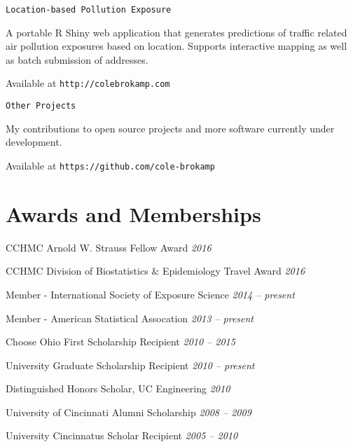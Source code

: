 \documentclass[margin,line]{res}
\newenvironment{list1}{
  \begin{list}{\ding{113}}{%
      \setlength{\itemsep}{0in}
      \setlength{\parsep}{0in} \setlength{\parskip}{0in}
      \setlength{\topsep}{0in} \setlength{\partopsep}{0in} 
      \setlength{\leftmargin}{0.17in}}}{\end{list}}
\newenvironment{list3}{
  \begin{list}{}{%
      \setlength{\itemsep}{0in}
      \setlength{\parsep}{0in} \setlength{\parskip}{0in}
      \setlength{\topsep}{0in} \setlength{\partopsep}{0in} 
      \setlength{\leftmargin}{0in}}}{\end{list}}
\begin{document}
\begin{resume}
\texttt{Location-based Pollution Exposure}
\begin{list1} \itemsep 2pt
\item[] A portable R Shiny web application that generates predictions of traffic related air pollution exposures based on location.  Supports interactive mapping as well as batch submission of addresses.
\item[] Available at \texttt{http://colebrokamp.com}
\end{list1}

\texttt{Other Projects}
\begin{list1} \itemsep 2pt
\item[] My contributions to open source projects and more software currently under development.
\item[] Available at \texttt{https://github.com/cole-brokamp}
\end{list1}

 

\section{\sc Awards and Memberships} 

\begin{list3} \itemsep 4pt   
\item[] CCHMC Arnold W. Strauss Fellow Award \hfill \textit{2016}
\item[] CCHMC Division of Biostatistics \& Epidemiology Travel Award \hfill \textit{2016}
\item[] Member - International Society of Exposure Science \hfill \textit{2014 -- present}
\item[] Member - American Statistical Assocation \hfill \textit{2013 -- present}
\item[] Choose Ohio First Scholarship Recipient \hfill \textit{2010 -- 2015}
\item[] University Graduate Scholarship Recipient \hfill \textit{2010 -- present}
\item[] Distinguished Honors Scholar, UC Engineering \hfill \textit{2010}
\item[] University of Cincinnati Alumni Scholarship \hfill \textit{2008 -- 2009}
\item[] University Cincinnatus Scholar Recipient \hfill \textit{2005 -- 2010}
\end{list3}



\end{resume}
\end{document}
